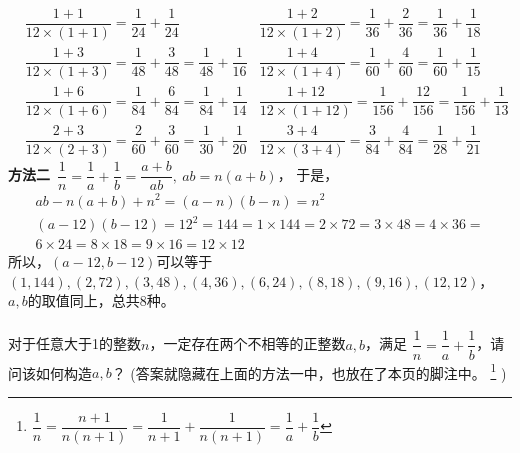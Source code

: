 \begin{enumerate}[label={【\textbf{例\thechapter.\arabic*}】},
 leftmargin=\inteval{\myenumleftmargin}pt,
 itemsep=\inteval{\myenumitempsep}pt,
 itemindent=\inteval{\myenumitemindent}pt]
\begin{align*}
    & \dfrac{1+1}{12\times(1+1)}=\dfrac{1}{24}+\dfrac{1}{24} 
    & \dfrac{1+2}{12\times(1+2)}=\dfrac{1}{36}+\dfrac{2}{36}=\dfrac{1}{36}+\dfrac{1}{18}\\
    & \dfrac{1+3}{12\times(1+3)}=\dfrac{1}{48}+\dfrac{3}{48}=\dfrac{1}{48}+\dfrac{1}{16} 
    & \dfrac{1+4}{12\times(1+4)}=\dfrac{1}{60}+\dfrac{4}{60}=\dfrac{1}{60}+\dfrac{1}{15} \\
    & \dfrac{1+6}{12\times(1+6)}=\dfrac{1}{84}+\dfrac{6}{84}=\dfrac{1}{84}+\dfrac{1}{14} 
    & \dfrac{1+12}{12\times(1+12)}=\dfrac{1}{156}+\dfrac{12}{156}=
    \dfrac{1}{156}+\dfrac{1}{13} \\
    & \dfrac{2+3}{12\times(2+3)}=\dfrac{2}{60}+\dfrac{3}{60}=\dfrac{1}{30}+\dfrac{1}{20} 
    & \dfrac{3+4}{12\times(3+4)}=\dfrac{3}{84}+\dfrac{4}{84}=\dfrac{1}{28}+\dfrac{1}{21} 
\end{align*}
\textbf{方法二}\ $ \dfrac{1}{n}=\dfrac{1}{a}+\dfrac{1}{b}=\dfrac{a+b}{ab},\ ab=n(a+b) $，
于是，
\begin{gather*}
    ab-n(a+b)+n^2=(a-n)(b-n)=n^2 \\
    (a-12)(b-12)=12^2=144=1\times144=2\times72=3\times48=4\times36=\\
    6\times24= 8\times18=9\times16=12\times12
\end{gather*}
所以，$ (a-12,b-12) $可以等于$ (1,144),(2,72),(3,48),(4,36),(6,24),(8,18),(9,16),
(12,12) $，$ a,b $的取值同上，总共8种。\\
\\
对于任意大于1的整数$ n $，一定存在两个不相等的正整数$ a,b $，满足
$ \dfrac{1}{n}=\dfrac{1}{a}+\dfrac{1}{b} $，请问该如何构造$ a,b $？
(答案就隐藏在上面的方法一中，也放在了本页的脚注中。
\footnote{$ \dfrac{1}{n}=\dfrac{n+1}{n(n+1)}=
   \dfrac{1}{n+1}+\dfrac{1}{n(n+1)}=\dfrac{1}{a}+\dfrac{1}{b}$} )


\end{enumerate}
